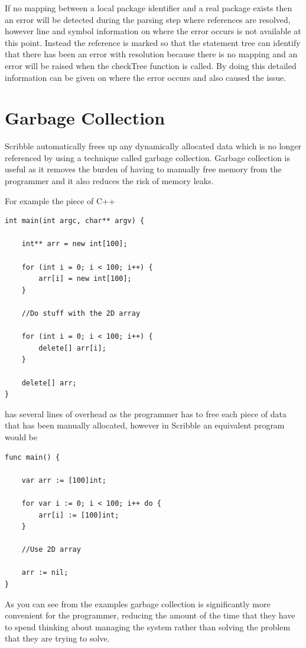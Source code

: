 \documentclass[]{final_report}
\begin{document}
If no mapping between a local package identifier and a real package exists then an error will be detected during the parsing step where references are resolved, however line and symbol information on where the error occurs is not available at this point. Instead the reference is marked so that the statement tree can identify that there has been an error with resolution because there is no mapping and an error will be raised when the checkTree function is called. By doing this detailed information can be given on where the error occurs and also caused the issue.

\chapter{Garbage Collection}

Scribble automatically frees up any dynamically allocated data which is no longer referenced by using a technique called garbage collection. Garbage collection is useful as it removes the burden of having to manually free memory from the programmer and it also reduces the risk of memory leaks. 

For example the piece of C++
\begin{verbatim}
int main(int argc, char** argv) {

	int** arr = new int[100];
	
	for (int i = 0; i < 100; i++) {
		arr[i] = new int[100];		
	}
	
	//Do stuff with the 2D array
	
	for (int i = 0; i < 100; i++) {
		delete[] arr[i];
	}
	
	delete[] arr;
}
\end{verbatim}
has several lines of overhead as the programmer has to free each piece of data that has been manually allocated, however in Scribble an equivalent program would be
\begin{verbatim}
func main() {

	var arr := [100]int;
	
	for var i := 0; i < 100; i++ do {
		arr[i] := [100]int;
	}
	
	//Use 2D array
	
	arr := nil;
}
\end{verbatim}
As you can see from the examples garbage collection is significantly more convenient for the programmer, reducing the amount of the time that they have to spend thinking about managing the system rather than solving the problem that they are trying to solve.
\end{document}
